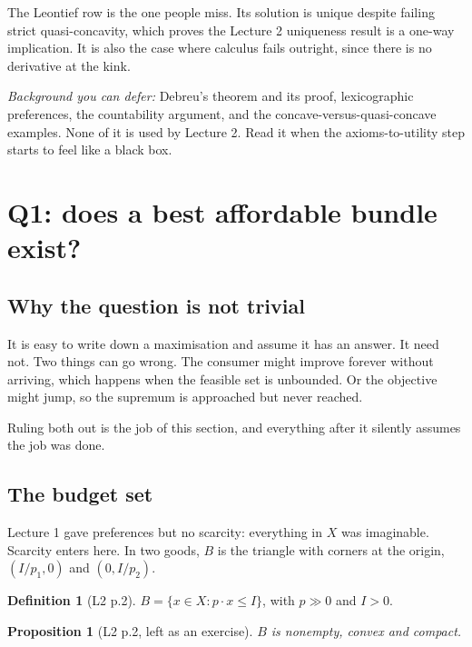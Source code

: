 \documentclass[11pt]{article}
\newtheorem{proposition}{Proposition}
\theoremstyle{definition}
\newtheorem{definition}{Definition}
\begin{document}
\vspace{3pt}
The Leontief row is the one people miss. Its solution is unique despite failing strict
quasi-concavity, which proves the Lecture 2 uniqueness result is a one-way implication. It
is also the case where calculus fails outright, since there is no derivative at the kink.

\vspace{4pt}
\noindent\textit{Background you can defer:} Debreu's theorem and its proof, lexicographic
preferences, the countability argument, and the concave-versus-quasi-concave examples. None
of it is used by Lecture 2. Read it when the axioms-to-utility step starts to feel like a
black box.

\clearpage

\section{Q1: does a best affordable bundle exist?}

\subsection{Why the question is not trivial}

It is easy to write down a maximisation and assume it has an answer. It need not. Two
things can go wrong. The consumer might improve forever without arriving, which happens
when the feasible set is unbounded. Or the objective might jump, so the supremum is
approached but never reached.

Ruling both out is the job of this section, and everything after it silently assumes the
job was done.

\subsection{The budget set}

Lecture 1 gave preferences but no scarcity: everything in $X$ was imaginable. Scarcity
enters here. In two goods, $B$ is the triangle with corners at the origin, $(I/p_1,0)$ and
$(0,I/p_2)$.

\begin{definition}[L2 p.2]
$B=\{x\in X: p\cdot x\le I\}$, with $p\gg0$ and $I>0$.
\end{definition}

\begin{proposition}[L2 p.2, left as an exercise]
$B$ is nonempty, convex and compact.
\end{proposition}
\end{document}
